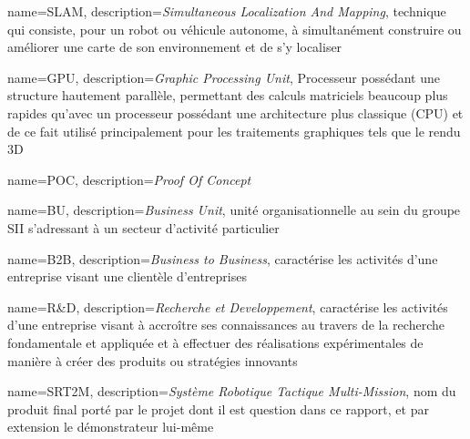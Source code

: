{
	name={SLAM},
	description={\emph{Simultaneous Localization And Mapping}, technique qui consiste, pour un robot ou véhicule autonome, à simultanément construire ou améliorer une carte de son environnement et de s’y localiser}
}

{
	name={GPU},
	description={\emph{Graphic Processing Unit}, Processeur possédant une structure hautement parallèle, permettant des calculs matriciels beaucoup plus rapides qu'avec un processeur possédant une architecture plus classique (CPU) et de ce fait utilisé principalement pour les traitements graphiques tels que le rendu 3D}
}

{
	name={POC},
	description={\emph{Proof Of Concept}}
}

{
	name={BU},
	description={\emph{Business Unit}, unité organisationnelle au sein du groupe SII s'adressant à un secteur d'activité particulier}
}

{
	name={B2B},
	description={\emph{Business to Business}, caractérise les activités d'une entreprise visant une clientèle d'entreprises}
}

{
	name={R\&D},
	description={\emph{Recherche et Developpement}, caractérise les activités d'une entreprise visant à accroître ses connaissances au travers de la recherche fondamentale et appliquée et à effectuer des réalisations expérimentales de manière à créer des produits ou stratégies innovants}
}

{
	name={SRT2M},
	description={\emph{Système Robotique Tactique Multi-Mission}, nom du produit final porté par le projet dont il est question dans ce rapport, et par extension le démonstrateur lui-même}
}

